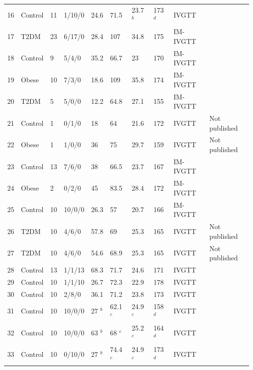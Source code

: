 \documentclass[utf8]{frontiersSCNS} %
\begin{document}
\begin{table}[h]
{\begin{tabular}{llllllllll}
16 & Control & 11 & 1/10/0  & 24.6   & 71.5    & 23.7 $^b$ & 173 $^d$ & IVGTT    & \cite{Viviani1999}                      \\
17 & T2DM    & 23 & 6/17/0  & 28.4   & 107     & 34.8   & 175   & IM-IVGTT & \cite{2005_YoungT2_Nolan}       \\
18 & Control & 9  & 5/4/0   & 35.2   & 66.7    & 23     & 170   & IM-IVGTT & \cite{2005_YoungT2_Nolan}       \\
19 & Obese   & 10 & 7/3/0   & 18.6   & 109     & 35.8   & 174   & IM-IVGTT & \cite{2005_YoungT2_Nolan}       \\
20 & T2DM    & 5  & 5/0/0   & 12.2   & 64.8    & 27.1   & 155   & IM-IVGTT & \cite{2005_YoungT2_Nolan}      \\
21 & Control & 1  & 0/1/0   & 18     & 64      & 21.6   & 172   & IVGTT    & Not published  \\
22 & Obese   & 1  & 1/0/0   & 36     & 75      & 29.7   & 159   & IVGTT    & Not published  \\
23 & Control & 13 & 7/6/0   & 38     & 66.5    & 23.7   & 167   & IM-IVGTT & \cite{1998_InsSens_Pacini}      \\
24 & Obese   & 2  & 0/2/0   & 45     & 83.5    & 28.4   & 172   & IM-IVGTT & \cite{1998_InsSens_Pacini}      \\
25 & Control & 10 & 10/0/0  & 26.3   & 57      & 20.7   & 166   & IM-IVGTT & \cite{2005_PCOS_Gennarelli}     \\
26 & T2DM    & 10 & 4/6/0   & 57.8   & 69      & 25.3   & 165   & IVGTT    & Not published  \\
27 & T2DM    & 10 & 4/6/0   & 54.6   & 68.9    & 25.3   & 165   & IVGTT    & Not published  \\
28 & Control & 13 & 1/1/13  & 68.3   & 71.7    & 24.6   & 171   & IVGTT    & \cite{pacini_1998}                      \\
29 & Control & 10 & 1/1/10  & 26.7   & 72.3    & 22.9   & 178   & IVGTT    & \cite{pacini_1998}                      \\
30 & Control & 10 & 2/8/0   & 36.1   & 71.2    & 23.8   & 173   & IVGTT    & \cite{nardi_1994}                      \\
31 & Control & 10 & 10/0/0  & 27 $^b$   & 62.1 $^c$ & 24.9 $^c$ & 158 $^d$ & IVGTT    & \cite{1998_AGING_Ahren}         \\
32 & Control & 10 & 10/0/0  & 63 $^b$   & 68 $^c$   & 25.2 $^c$ & 164 $^d$ & IVGTT    & \cite{1998_AGING_Ahren}         \\
33 & Control & 10 & 0/10/0  & 27 $^b$   & 74.4 $^c$ & 24.9 $^c$ & 173 $^d$ & IVGTT    & \cite{1998_AGING_Ahren}        \\

\end{tabular}}
\end{table}
\end{document}
